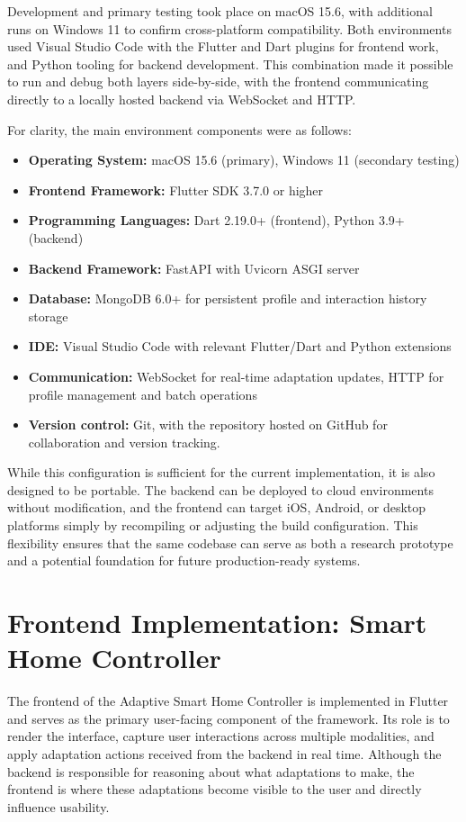 \documentclass[openany]{book}
\begin{document}
Development and primary testing took place on macOS 15.6, with additional runs on Windows 11 to confirm cross-platform compatibility. Both environments used Visual Studio Code with the Flutter and Dart plugins for frontend work, and Python tooling for backend development. This combination made it possible to run and debug both layers side-by-side, with the frontend communicating directly to a locally hosted backend via WebSocket and HTTP.

For clarity, the main environment components were as follows:
\begin{itemize}
    \item \textbf{Operating System:} macOS 15.6 (primary), Windows 11 (secondary testing)
    \item \textbf{Frontend Framework:} Flutter SDK 3.7.0 or higher
    \item \textbf{Programming Languages:} Dart 2.19.0+ (frontend), Python 3.9+ (backend)
    \item \textbf{Backend Framework:} FastAPI with Uvicorn ASGI server
    \item \textbf{Database:} MongoDB 6.0+ for persistent profile and interaction history storage
    \item \textbf{IDE:} Visual Studio Code with relevant Flutter/Dart and Python extensions
    \item \textbf{Communication:} WebSocket for real-time adaptation updates, HTTP for profile management and batch operations
    \item \textbf{Version control:} Git, with the repository hosted on GitHub for collaboration and version tracking.
\end{itemize}

While this configuration is sufficient for the current implementation, it is also designed to be portable. The backend can be deployed to cloud environments without modification, and the frontend can target iOS, Android, or desktop platforms simply by recompiling or adjusting the build configuration. This flexibility ensures that the same codebase can serve as both a research prototype and a potential foundation for future production-ready systems.

\section{Frontend Implementation: Smart Home Controller}
The frontend of the Adaptive Smart Home Controller is implemented in Flutter and serves as the primary user-facing component of the framework. Its role is to render the interface, capture user interactions across multiple modalities, and apply adaptation actions received from the backend in real time. Although the backend is responsible for reasoning about what adaptations to make, the frontend is where these adaptations become visible to the user and directly influence usability.
\end{document}
